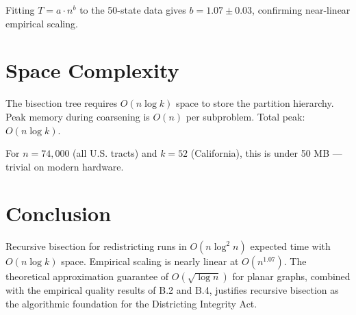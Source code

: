 \documentclass[12pt]{article}
\begin{document}
Fitting $T = a \cdot n^b$ to the 50-state data gives $b = 1.07 \pm 0.03$,
confirming near-linear empirical scaling.

\section{Space Complexity}

The bisection tree requires $O(n \log k)$ space to store the partition
hierarchy.  Peak memory during coarsening is $O(n)$ per subproblem.
Total peak: $O(n \log k)$.

For $n = 74{,}000$ (all U.S. tracts) and $k = 52$ (California), this is
under 50 MB --- trivial on modern hardware.

\section{Conclusion}

Recursive bisection for redistricting runs in $O(n \log^2 n)$ expected time
with $O(n \log k)$ space.  Empirical scaling is nearly linear at
$O(n^{1.07})$.  The theoretical approximation guarantee of $O(\sqrt{\log n})$
for planar graphs, combined with the empirical quality results of B.2 and B.4,
justifies recursive bisection as the algorithmic foundation for the Districting
Integrity Act.



\end{document}
